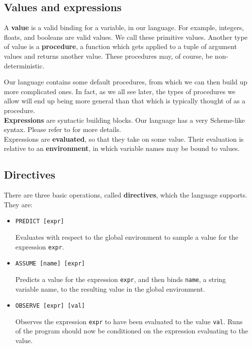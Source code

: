 \documentclass[10pt]{article}
\begin{document}

\subsection{Values and expressions}


A {\bf value} is a valid binding for a variable, in our language.  For example, integers, floats, and booleans are valid values.  We call these primitive values.  Another type of value is a {\bf procedure}, a function which gets applied to a tuple of argument values and returns another value.  These procedures may, of course, be non-deterministic.  

Our language contains some default procedures, from which we can then build up more complicated ones.  In fact, as we all see later, the types of procedures we allow will end up being more general than that which is typically thought of as a procedure.  \\

{\bf Expressions} are syntactic building blocks.  Our language has a very Scheme-like syntax.  Please refer to \cite{Goodman} for more details.\\

Expressions are {\bf evaluated}, so that they take on some value.  Their evaluation is relative to an {\bf environment}, in which variable names may be bound to values.   

\subsection{Directives}

There are three basic operations, called {\bf directives}, which the language supports.  They are:

\begin{itemize}
\item {\tt PREDICT [expr]} 

Evaluates with respect to the global environment to sample a value for the expression {\tt expr}.

\item {\tt ASSUME [name] [expr]} 

Predicts a value for the expression {\tt expr}, and then binds {\tt name}, a string variable name, to the resulting value in the global environment.

\item {\tt OBSERVE [expr] [val]} 

Observes the expression {\tt expr} to have been evaluated to the value {\tt val}.  Runs of the program should now be conditioned on the expression evaluating to the value.
\end{itemize}
\end{document}
